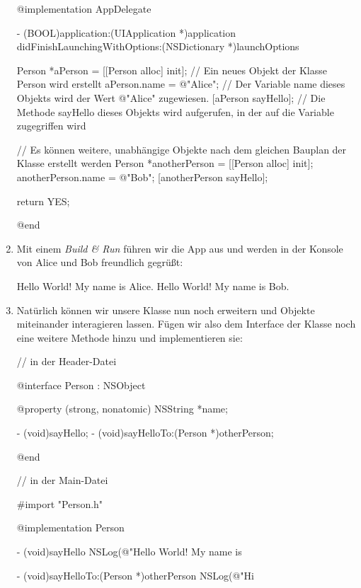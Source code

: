 \documentclass[parskip=half, final]{scrreprt}
\begin{document}
\begin{lecture}
\begin{enumerate}
\begin{objclst}
@implementation AppDelegate

- (BOOL)application:(UIApplication *)application didFinishLaunchingWithOptions:(NSDictionary *)launchOptions {

    Person *aPerson = [[Person alloc] init]; // Ein neues Objekt der Klasse Person wird erstellt
    aPerson.name = @"Alice"; // Der Variable name dieses Objekts wird der Wert @"Alice" zugewiesen.
    [aPerson sayHello]; // Die Methode sayHello dieses Objekts wird aufgerufen, in der auf die Variable zugegriffen wird

    // Es können weitere, unabhängige Objekte nach dem gleichen Bauplan der Klasse erstellt werden
    Person *anotherPerson = [[Person alloc] init];
    anotherPerson.name = @"Bob";
    [anotherPerson sayHello];

    return YES;
}

@end
\end{objclst}

\item Mit einem \emph{Build \& Run} führen wir die App aus und werden in der Konsole von Alice und Bob freundlich gegrüßt:

\begin{objclst}
Hello World! My name is Alice.
Hello World! My name is Bob.
\end{objclst}

\item Natürlich können wir unsere Klasse nun noch erweitern und Objekte miteinander interagieren lassen. Fügen wir also dem Interface der Klasse  noch eine weitere Methode  hinzu und implementieren sie:

\begin{objclst}
// in der Header-Datei

@interface Person : NSObject

@property (strong, nonatomic) NSString *name;

- (void)sayHello;
- (void)sayHelloTo:(Person *)otherPerson;

@end

// in der Main-Datei

#import "Person.h"

@implementation Person

- (void)sayHello {
    NSLog(@"Hello World! My name is %
}

- (void)sayHelloTo:(Person *)otherPerson {
    NSLog(@"Hi %
}


\end{objclst}
\end{enumerate}
\end{lecture}
\end{document}
